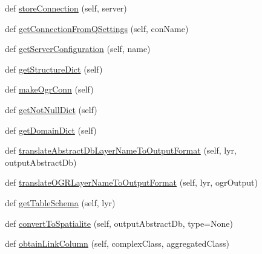 \begin{DoxyCompactItemize}
\item 
def \mbox{\hyperlink{class_dsg_tools_1_1_factories_1_1_db_factory_1_1postgis_db_1_1_postgis_db_a70b28af38ea5fc560b5ce30abee0a5b2}{store\+Connection}} (self, server)
\item 
def \mbox{\hyperlink{class_dsg_tools_1_1_factories_1_1_db_factory_1_1postgis_db_1_1_postgis_db_afe374d35d99247bce7b727441e0287e8}{get\+Connection\+From\+Q\+Settings}} (self, con\+Name)
\item 
def \mbox{\hyperlink{class_dsg_tools_1_1_factories_1_1_db_factory_1_1postgis_db_1_1_postgis_db_a8860ba56c1bcb5721a2130b1c7530104}{get\+Server\+Configuration}} (self, name)
\item 
def \mbox{\hyperlink{class_dsg_tools_1_1_factories_1_1_db_factory_1_1postgis_db_1_1_postgis_db_ae29ae632868ad2dbd4e57494af7f6e08}{get\+Structure\+Dict}} (self)
\item 
def \mbox{\hyperlink{class_dsg_tools_1_1_factories_1_1_db_factory_1_1postgis_db_1_1_postgis_db_a41684c4b7f79ba2b21e4bea0c18d7804}{make\+Ogr\+Conn}} (self)
\item 
def \mbox{\hyperlink{class_dsg_tools_1_1_factories_1_1_db_factory_1_1postgis_db_1_1_postgis_db_abaf725509d5d11eec8da36fbaf99e2ac}{get\+Not\+Null\+Dict}} (self)
\item 
def \mbox{\hyperlink{class_dsg_tools_1_1_factories_1_1_db_factory_1_1postgis_db_1_1_postgis_db_a7b09d35205eb58213e342938f1c498f4}{get\+Domain\+Dict}} (self)
\item 
def \mbox{\hyperlink{class_dsg_tools_1_1_factories_1_1_db_factory_1_1postgis_db_1_1_postgis_db_a76ef724edcd5902e8ebf520d2e77170f}{translate\+Abstract\+Db\+Layer\+Name\+To\+Output\+Format}} (self, lyr, output\+Abstract\+Db)
\item 
def \mbox{\hyperlink{class_dsg_tools_1_1_factories_1_1_db_factory_1_1postgis_db_1_1_postgis_db_a195d2a88eac9832fc26a5a2360170c64}{translate\+O\+G\+R\+Layer\+Name\+To\+Output\+Format}} (self, lyr, ogr\+Output)
\item 
def \mbox{\hyperlink{class_dsg_tools_1_1_factories_1_1_db_factory_1_1postgis_db_1_1_postgis_db_a6fda820eb975b10f79452e95fe3225cc}{get\+Table\+Schema}} (self, lyr)
\item 
def \mbox{\hyperlink{class_dsg_tools_1_1_factories_1_1_db_factory_1_1postgis_db_1_1_postgis_db_ac900af7485f736aa0337be6b7e758ef0}{convert\+To\+Spatialite}} (self, output\+Abstract\+Db, type=None)
\item 
def \mbox{\hyperlink{class_dsg_tools_1_1_factories_1_1_db_factory_1_1postgis_db_1_1_postgis_db_af56a40cf1c4ffa7d251cf7bba5618af5}{obtain\+Link\+Column}} (self, complex\+Class, aggregated\+Class)

\end{DoxyCompactItemize}
